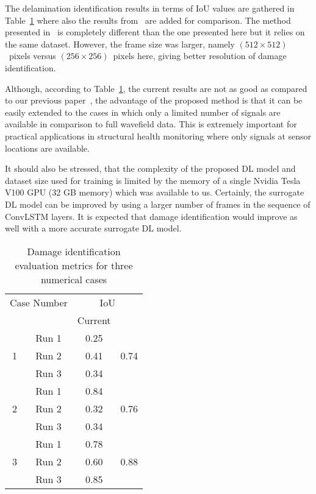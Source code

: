 \documentclass[sn-mathphys-num]{sn-jnl}%
\begin{document}
	The delamination identification results in terms of IoU values are gathered 
	in Table~\ref{tab:iou} where also the results from~\cite{Ullah2023} are 
	added for comparison.
	The method presented in~\cite{Ullah2023} is completely different than the 
	one presented here but it relies on the same dataset.
	However, the frame size was larger, namely \((512\times512)\)~pixels versus 
	\((256\times256)\)~pixels here, giving better resolution of damage 
	identification.
	
	Although, according to Table~\ref{tab:iou}, the current results are not as 
	good as compared to our previous paper~\cite{Ullah2023}, the advantage of 
	the proposed method is that it can be easily extended to the cases in which 
	only a limited number of signals are available in comparison to full 
	wavefield data.
	This is extremely important for practical applications in structural health 
	monitoring where only signals at sensor locations are available.
	
	It should also be stressed, that the complexity of the proposed DL model 
	and dataset size used for training is limited by the memory of a single 
	Nvidia Tesla V100 GPU (32 GB memory) which was available to us.
	Certainly, the surrogate DL model can be improved by using a larger number 
	of frames in the sequence of ConvLSTM layers. 
	It is expected that damage identification would improve as well with a more 
	accurate surrogate DL model.
	
\begin{table}[ht]
	\caption{Damage identification evaluation metrics for three numerical cases}
	\label{tab:iou}
	\begin{tabular*}{\textwidth}{@{\extracolsep{\fill}}cccc}
		\toprule
		\multicolumn{2}{c}{Case Number} & \multicolumn{2}{c}{IoU} \\ 
		\cmidrule(lr){3-4} 
		& & Current & \cite{Ullah2023}\\
		\midrule
		\multirow{3}{*}{1} & Run 1 & 0.25 & \multirow{3}{*}{0.74} \\ 
		& Run 2 & 0.41 & \\ 
		& Run 3 & 0.34 & \\ 
		\midrule
		\multirow{3}{*}{2} & Run 1 & 0.84 & \multirow{3}{*}{0.76} \\ 
		& Run 2 & 0.32 & \\ 
		& Run 3 & 0.34 & \\ 
		\midrule
		\multirow{3}{*}{3} & Run 1 & 0.78 & \multirow{3}{*}{0.88} \\ 
		& Run 2 & 0.60 & \\ 
		& Run 3 & 0.85 & \\ 
		\bottomrule
	\end{tabular*}
\end{table}
\end{document}
